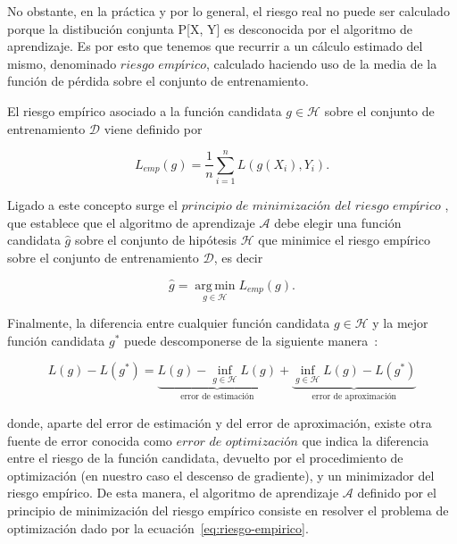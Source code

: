 No obstante, en la práctica y por lo general, el riesgo real no puede ser calculado porque la distibución conjunta P[X, Y] es desconocida por el algoritmo de aprendizaje. Es por esto que tenemos que recurrir a un cálculo estimado del mismo, denominado $\textit{riesgo empírico}$, calculado haciendo uso de la media de la función de pérdida sobre el conjunto de entrenamiento.\newline

\begin{definicion}\label{def:riesgo-empírico}
    El riesgo empírico asociado a la función candidata $g \in \mathcal{H}$ sobre el conjunto de entrenamiento $\mathcal{D}$ viene definido por

    \[ L_{emp}(g) = \frac{1}{n} \sum_{i=1}^{n}L(g(X_{i}), Y_{i}). \]\newline
\end{definicion}

Ligado a este concepto surge el $\textit{principio de minimización del riesgo empírico}$ \cite{Vapnik1991}, que establece que el algoritmo de aprendizaje $\mathcal{A}$ debe elegir una función candidata $\hat{g}$ sobre el conjunto de hipótesis $\mathcal{H}$ que minimice el riesgo empírico sobre el conjunto de entrenamiento $\mathcal{D}$, es decir

\begin{equation}\label{eq:riesgo-empirico}
    \hat{g} = \operatorname*{\arg \,\min}_{g \in \mathcal{H}} L_{emp}(g). 
\end{equation}\newline

Finalmente, la diferencia entre cualquier función candidata $g \in \mathcal{H}$ y la mejor función candidata $g^{*}$ puede descomponerse de la siguiente manera~\cite{Lafon2024}:

\[
L(g) - L(g^{*}) = \underbrace{L(g) - \inf_{g \in \mathcal{H}} L(g)}_{\text{error de estimación}} + \underbrace{\inf_{g \in \mathcal{H}} L(g) - L(g^{*})}_{\text{error de aproximación}}
\]

donde, aparte del error de estimación y del error de aproximación, existe otra fuente de error conocida como $\textit{error de optimización}$ que indica la diferencia entre el riesgo de la función candidata, devuelto por el procedimiento de optimización (en nuestro caso el descenso de gradiente), y un minimizador del riesgo empírico. De esta manera, el algoritmo de aprendizaje $\mathcal{A}$ definido por el principio de minimización del riesgo empírico consiste en resolver el problema de optimización dado por la ecuación~\eqref{eq:riesgo-empirico}.\newline

